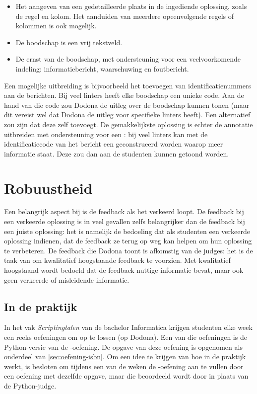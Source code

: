 \begin{itemize}
    \item Het aangeven van een gedetailleerde plaats in de ingediende oplossing, zoals de regel en kolom.
    Het aanduiden van meerdere opeenvolgende regels of kolommen is ook mogelijk.
    \item De boodschap is een vrij tekstveld.
    \item De ernst van de boodschap, met ondersteuning voor een veelvoorkomende indeling: informatiebericht, waarschuwing en foutbericht.
\end{itemize}

Een mogelijke uitbreiding is bijvoorbeeld het toevoegen van identificatienummers aan de berichten.
Bij veel linters heeft elke boodschap een unieke code.
Aan de hand van die code zou Dodona de uitleg over de boodschap kunnen tonen (maar dit vereist wel dat Dodona de uitleg voor specifieke linters heeft).
Een alternatief zou zijn dat \tested{} deze zelf toevoegt.
De gemakkelijkste oplossing is echter de annotatie uitbreiden met ondersteuning voor een : bij veel linters kan met de identificatiecode van het bericht een  geconstrueerd worden waarop meer informatie staat.
Deze  zou dan aan de studenten kunnen getoond worden.

\section{Robuustheid}\label{sec:robuustheid}

Een belangrijk aspect bij  is de feedback als het verkeerd loopt.
De feedback bij een verkeerde oplossing is in veel gevallen zelfs belangrijker dan de feedback bij een juiste oplossing: het is namelijk de bedoeling dat als studenten een verkeerde oplossing indienen, dat de feedback ze terug op weg kan helpen om hun oplossing te verbeteren.
De feedback die Dodona toont is afkomstig van de judges: het is de taak van \tested{} om kwalitatief hoogstaande feedback te voorzien.
Met kwalitatief hoogstaand wordt bedoeld dat de feedback nuttige informatie bevat, maar ook geen verkeerde of misleidende informatie.

\subsection{In de praktijk}\label{subsec:in-de-praktijk}

In het vak \emph{Scriptingtalen} van de bachelor Informatica krijgen studenten elke week een reeks oefeningen om op te lossen (op Dodona).
Een van die oefeningen is de Python-versie van de \emph{}-oefening.
De opgave van deze oefening is opgenomen als onderdeel van \cref{sec:oefening-isbn}.
Om een idee te krijgen van hoe \tested{} in de praktijk werkt, is besloten om tijdens een van de weken de \emph{}-oefening aan te vullen door een oefening met dezelfde opgave, maar die beoordeeld wordt door \tested{} in plaats van de Python-judge.


